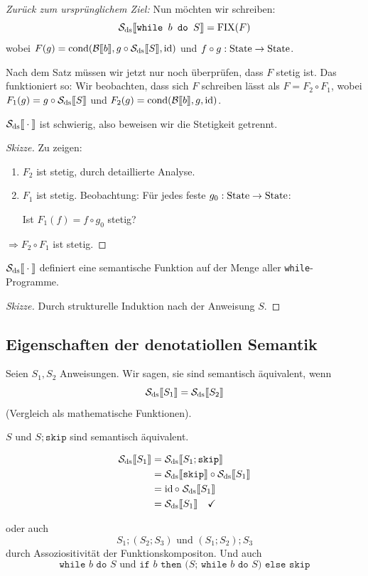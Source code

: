 \par\medskip
\emph{Zurück zum ursprünglichem Ziel:} Nun möchten wir schreiben: \[ \Sdssem{\texttt{while $b$ do $S$}} = \fix(F)
\] wobei $F(g) = \cond(\Bsem{b}, g \circ \Sdssem{S}, \id)$ und $f \circ g: \State \to \State$.


Nach dem Satz müssen wir jetzt nur noch überprüfen, dass $F$ stetig ist.
Das funktioniert so: Wir beobachten, dass sich $F$ schreiben lässt als $F = F_2 \circ F_1$, wobei $F_1(g) = g \circ \Sdssem{S}$
und $F_2(g) = \cond(\Bsem{b}, g, \id)$.

$\Sdssem{\cdot}$ ist schwierig, also beweisen wir die Stetigkeit getrennt.

\begin{proof}[Skizze]
    Zu zeigen:
    \begin{enumerate}
        \item $F_2$ ist stetig, durch detaillierte Analyse.
        \item $F_1$ ist stetig. Beobachtung: Für jedes feste $g_0: \State \to \State$:

            Ist $F_1(f) = f \circ g_0$ stetig?
    \end{enumerate}
    $\Rightarrow F_2 \circ F_1$ ist stetig.
\end{proof}


\begin{theorem}
    $\Sdssem{\cdot}$ definiert eine semantische Funktion auf der Menge aller \texttt{while}-Programme.
\end{theorem}

\begin{proof}[Skizze]
    Durch strukturelle Induktion nach der Anweisung $S$.
\end{proof}



\subsection{Eigenschaften der denotatiollen Semantik}

Seien $S_1, S_2$ Anweisungen. Wir sagen, sie sind semantisch äquivalent, wenn \[
    \Sdssem{S_1} = \Sdssem{S_2}
\] (Vergleich als mathematische Funktionen).

\par\medskip
\begin{example}
    $S$ und $S; \texttt{skip}$ sind semantisch äquivalent.

    \begin{align*}
        \Sdssem{S_1} & = \Sdssem{S_1; \texttt{skip}} \\
        & =\Sdssem{\texttt{skip}} \circ \Sdssem{S_1} \\
        & = \id \circ \; \Sdssem{S_1} \\
        & = \Sdssem{S_1} \quad \checkmark
    \end{align*}

    oder auch \[
        S_1; (S_2; S_3) \text{ und } (S_1; S_2); S_3
    \] durch Assoziositivität der Funktionskompositon. Und auch \[
        \texttt{while $b$ do $S$} \text{ und } \texttt{if $b$ then ($S$; while $b$ do $S$) else skip}
    \]
\end{example}


